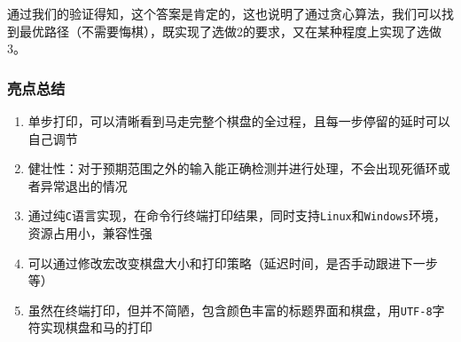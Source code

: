 通过我们的验证得知，这个答案是肯定的，这也说明了通过贪心算法，我们可以找到最优路径（不需要悔棋），既实现了选做2的要求，又在某种程度上实现了选做3。

\vspace{1ex}

\subsubsection{亮点总结}

\begin{enumerate}
    \item 单步打印，可以清晰看到马走完整个棋盘的全过程，且每一步停留的延时可以自己调节
    \item 健壮性：对于预期范围之外的输入能正确检测并进行处理，不会出现死循环或者异常退出的情况
    \item 通过纯{\tt C}语言实现，在命令行终端打印结果，同时支持{\tt Linux}和{\tt Windows}环境，
    资源占用小，兼容性强
    \item 可以通过修改宏改变棋盘大小和打印策略（延迟时间，是否手动跟进下一步等）
    \item 虽然在终端打印，但并不简陋，包含颜色丰富的标题界面和棋盘，用{\tt UTF-8}字符实现棋盘和马的打印
\end{enumerate}
